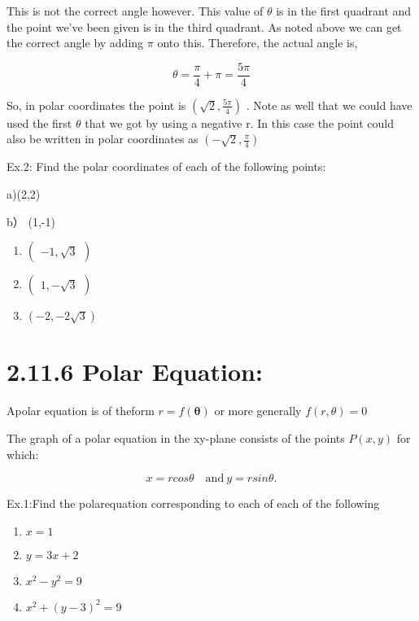 \documentclass[
  letterpaper,
  DIV=11,
  numbers=noendperiod]{scrartcl}
\begin{document}
This is not the correct angle however. This value of \(\theta\) is in
the first quadrant and the point we've been given is in the third
quadrant. As noted above we can get the correct angle by adding \(\pi\)
onto this. Therefore, the actual angle is,

\[\theta=\frac{\pi}{4}+\pi=\frac{5\pi}{4}\]

So, in polar coordinates the point is \((\sqrt{2},\frac{5\pi}{4})\) .
Note as well that we could have used the first \(\theta\) that we got by
using a negative r. In this case the point could also be written in
polar coordinates as \(\left(-\sqrt{2},\frac{\pi}{4}\right)\)

Ex.2: Find the polar coordinates of each of the following points:

a)(2,2)

b） (1,-1)

\begin{enumerate}
\def\labelenumi{\alph{enumi})}
\setcounter{enumi}{2}
\item
  \(\begin{pmatrix}-1,\sqrt{3}\end{pmatrix}\)
\item
  \(\begin{pmatrix}1,-\sqrt{3}\end{pmatrix}\)
\item
  \(\left(-2,-2\sqrt{3}\right)\)
\end{enumerate}

\section{2.11.6 Polar Equation:}\label{polar-equation}

Apolar equation is of theform \(r=f(\boldsymbol{\theta})\) or more
generally \(f(r,\theta)=0\)

The graph of a polar equation in the xy-plane consists of the points
\(P(x,y)\) for which:

\[x=rcos\theta\quad\mathrm{and}\:y=rsin\theta.\]

Ex.1:Find the polarequation corresponding to each of each of the
following

\begin{enumerate}
\def\labelenumi{\alph{enumi})}
\item
  \(x=1\)
\item
  \(y=3x+2\)
\item
  \(x^{2}-y^{2}=9\)
\item
  \(x^{2}+(y-3)^{2}=9\)
\end{enumerate}
\end{document}
